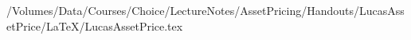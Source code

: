 /Volumes/Data/Courses/Choice/LectureNotes/AssetPricing/Handouts/LucasAssetPrice/LaTeX/LucasAssetPrice.tex